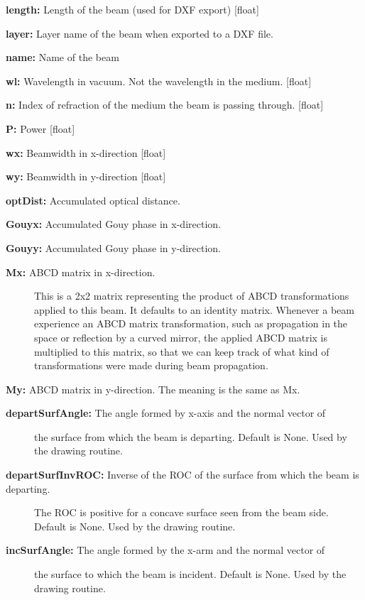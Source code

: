 \documentclass[letterpaper,10pt,english]{sphinxmanual}
\begin{document}
\begin{fulllineitems}
\textbf{length:} Length of the beam (used for DXF export) {[}float{]}

\textbf{layer:} Layer name of the beam when exported to a DXF file.

\textbf{name:} Name of the beam

\textbf{wl:} Wavelength in vacuum. Not the wavelength in the medium. {[}float{]}

\textbf{n:} Index of refraction of the medium the beam is passing through. {[}float{]}

\textbf{P:} Power {[}float{]}

\textbf{wx:} Beamwidth in x-direction {[}float{]}

\textbf{wy:} Beamwidth in y-direction {[}float{]}

\textbf{optDist:} Accumulated optical distance.

\textbf{Gouyx:} Accumulated Gouy phase in x-direction.

\textbf{Gouyy:} Accumulated Gouy phase in y-direction.
\begin{description}
\item[{\textbf{Mx:} ABCD matrix in x-direction.}] \leavevmode
This is a 2x2 matrix representing the product
of ABCD transformations applied to this beam.
It defaults to an identity matrix.
Whenever a beam experience an ABCD matrix
transformation, such as propagation in the space
or reflection by a curved mirror, the applied ABCD
matrix is multiplied to this matrix, so that we can
keep track of what kind of transformations were
made during beam propagation.

\end{description}

\textbf{My:} ABCD matrix in y-direction. The meaning is the same as Mx.
\begin{description}
\item[{\textbf{departSurfAngle:} The angle formed by x-axis and the normal vector of}] \leavevmode
the surface from which the beam is departing.
Default is None. Used by the drawing routine.

\item[{\textbf{departSurfInvROC:} Inverse of the ROC of the surface from which the beam is departing.}] \leavevmode
The ROC is positive for a concave surface seen from
the beam side.
Default is None. Used by the drawing routine.

\item[{\textbf{incSurfAngle:} The angle formed by the x-arm and the normal vector of}] \leavevmode
the surface to which the beam is incident.
Default is None. Used by the drawing routine.


\end{description}
\end{fulllineitems}
\end{document}
